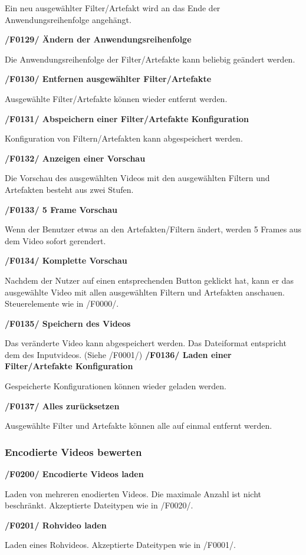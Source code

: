 \documentclass[parskip=full]{scrartcl}
\begin{document}
Ein neu ausgewählter Filter/Artefakt wird an das Ende der Anwendungsreihenfolge angehängt.

\textbf{/F0129/ Ändern der Anwendungsreihenfolge}

Die Anwendungsreihenfolge der Filter/Artefakte kann beliebig geändert werden.

\textbf{/F0130/ Entfernen ausgewählter Filter/Artefakte}

Ausgewählte Filter/Artefakte können wieder entfernt werden.

\textbf{/F0131/ Abspeichern einer Filter/Artefakte Konfiguration}

Konfiguration von Filtern/Artefakten kann abgespeichert werden.

\textbf{/F0132/ Anzeigen einer Vorschau}

Die Vorschau des ausgewählten Videos mit den ausgewählten Filtern und Artefakten besteht aus zwei Stufen.

\textbf{/F0133/ 5 Frame Vorschau}

Wenn der Benutzer etwas an den Artefakten/Filtern ändert, werden 5 Frames aus dem Video sofort gerendert.

\textbf{/F0134/ Komplette Vorschau}

Nachdem der Nutzer auf einen entsprechenden Button geklickt hat, kann er das ausgewählte Video mit allen ausgewählten Filtern und Artefakten anschauen. Steuerelemente wie in /F0000/.

\textbf{/F0135/ Speichern des Videos}

Das veränderte Video kann abgespeichert werden. Das Dateiformat entspricht dem des Inputvideos. (Siehe /F0001/)
\newpage
\textbf{/F0136/ Laden einer Filter/Artefakte Konfiguration}

Gespeicherte Konfigurationen können wieder geladen werden.

\textbf{/F0137/ Alles zurücksetzen}

Ausgewählte Filter und Artefakte können alle auf einmal entfernt werden.
\subsubsection{Encodierte Videos bewerten}
\textbf{/F0200/ Encodierte Videos laden}

Laden von mehreren enodierten Videos. Die maximale Anzahl ist nicht beschränkt. Akzeptierte Dateitypen wie in /F0020/.

\textbf{/F0201/ Rohvideo laden}

Laden eines Rohvideos. Akzeptierte Dateitypen wie in /F0001/.
\end{document}
